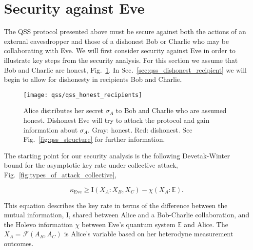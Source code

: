 \section{Security against Eve}\label{sec:qss_honest_recipients}

The QSS protocol presented above must be secure against both the actions of an external eavesdropper and those of a dishonest Bob or Charlie who may be collaborating with Eve. We will first consider security against Eve in order to illustrate key steps from the security analysis. For this section we assume that Bob and Charlie are honest,
Fig.~\ref{fig:qss_honest_recipients}. In Sec.~\ref{sec:qss_dishonest_recipient} we will begin to allow for dishonesty in recipients Bob and Charlie.

\begin{figure}[htp]
\captionsetup{width=0.8\linewidth}
\centering
\texttt{[image: qss/qss\_honest\_recipients]}
\caption{\label{fig:qss_honest_recipients} Alice distributes her secret $\sigma_A$ to Bob and Charlie who are assumed honest. Dishonest Eve will try to attack the protocol and gain information about $\sigma_A$. Gray: honest. Red: dishonest. See Fig.~\ref{fig:qss_structure} for further information.}
\end{figure}


The starting point for our security analysis is the following Devetak-Winter bound \cite{Devetak2004} for the asymptotic key rate under collective attack, Fig.~\ref{fig:types_of_attack_collective},


\begin{equation}\label{eqn:qss_dw_eve}
\kappa_{\text{Eve}} \ge \text{I}\left(X_A : X_B, X_C\right) - \chi\left(X_A : \mathbb{E}\right).
\end{equation}

\noindent This equation describes the key rate in terms of the difference between the mutual information, $\text{I}$, shared between Alice and a Bob-Charlie collaboration, and the Holevo information $\chi$ between Eve's quantum system $\mathbb{E}$ and Alice. %
The $X_A = \mathcal{F}\left(A_B, A_C\right)$ is Alice's variable based on her heterodyne measurement outcomes.

